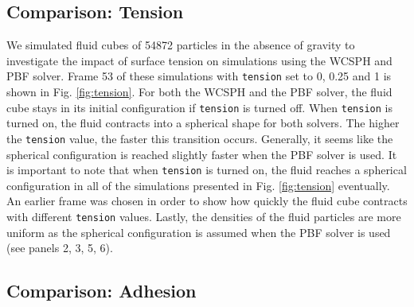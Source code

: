 \documentclass[11pt, letterpaper, twocolumn]{article}
\begin{document}
\subsection{Comparison: Tension}
\label{subsec:comparison_tension}

We simulated fluid cubes of 54872 particles in the absence of gravity to investigate the impact of surface tension on simulations using the WCSPH and PBF solver.
Frame 53 of these simulations with \texttt{tension} set to 0, 0.25 and 1 is shown in Fig. \ref{fig:tension}. For both the WCSPH and the PBF solver, the fluid cube stays in its initial configuration
if \texttt{tension} is turned off. When \texttt{tension} is turned on, the fluid contracts into a spherical shape for both solvers. The higher the \texttt{tension} value, the faster this transition occurs. Generally, it seems like the spherical configuration is reached slightly faster when the PBF solver is used. It is important to note that when 
\texttt{tension} is turned on, the fluid reaches a spherical configuration in all of the simulations presented in Fig. \ref{fig:tension} eventually. An earlier frame was chosen in order to show how quickly the fluid cube contracts with different \texttt{tension} values. Lastly, the densities of the fluid particles are more uniform as the spherical configuration
is assumed when the PBF solver is used (see panels 2, 3, 5, 6).

\subsection{Comparison: Adhesion}
\label{subsec:comparison_adhesion}
\end{document}
